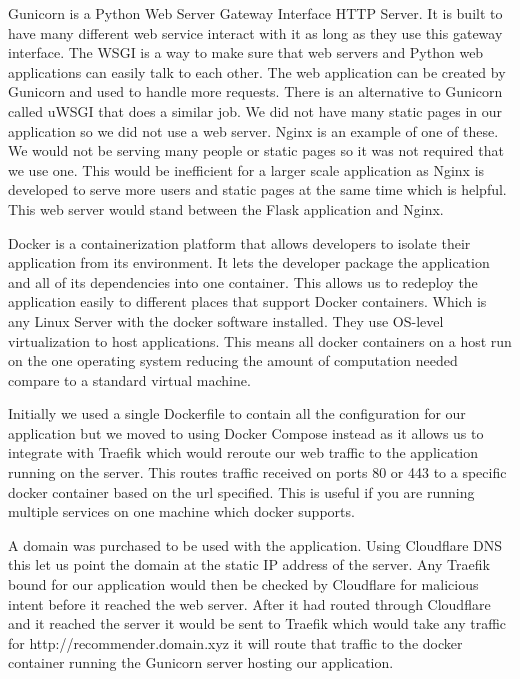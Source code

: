                     Gunicorn is a Python Web Server Gateway Interface HTTP Server. It is built to have many different web service interact with it as long as they use this gateway interface. The WSGI is a way to make sure that web servers and Python web applications can easily talk to each other. The web application can be created by Gunicorn and used to handle more requests. There is an alternative to Gunicorn called uWSGI that does a similar job. We did not have many static pages in our application so we did not use a web server. Nginx is an example of one of these. We would not be serving many people or static pages so it was not required that we use one. This would be inefficient for a larger scale application as Nginx is developed to serve more users and static pages at the same time which is helpful. This web server would stand between the Flask application and Nginx.

                    Docker is a containerization platform that allows developers to isolate their application from its environment. It lets the developer package the application and all of its dependencies into one container. This allows us to redeploy the application easily to different places that support Docker containers. Which is any Linux Server with the docker software installed. They use OS-level virtualization to host applications. This means all docker containers on a host run on the one operating system reducing the amount of computation needed compare to a standard virtual machine. 
                    
                    Initially we used a single Dockerfile to contain all the configuration for our application but we moved to using Docker Compose instead as it allows us to integrate with Traefik which would reroute our web traffic to the application running on the server. This routes traffic received on ports 80 or 443 to a specific docker container based on the url specified. This is useful if you are running multiple services on one machine which docker supports. 

                    A domain was purchased to be used with the application. Using Cloudflare DNS this let us point the domain at the static IP address of the server. Any Traefik bound for our application would then be checked by Cloudflare for malicious intent before it reached the web server. After it had routed through Cloudflare and it reached the server it would be sent to Traefik which would take any traffic for http://recommender.domain.xyz it will route that traffic to the docker container running the Gunicorn server hosting our application. 


